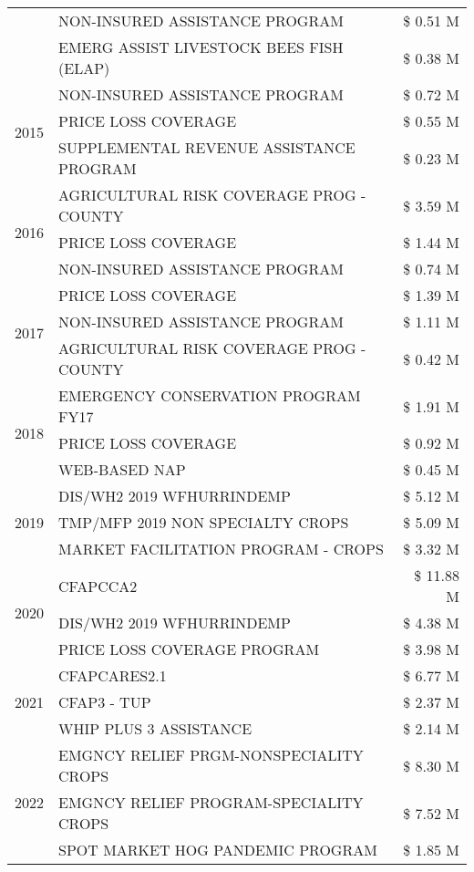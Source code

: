 \begin{tabular}{llr}
 & NON-INSURED ASSISTANCE PROGRAM & \$ 0.51 M \\
 & EMERG ASSIST LIVESTOCK BEES FISH (ELAP) & \$ 0.38 M \\
\cline{1-3}
\multirow[t]{3}{*}{2015} & NON-INSURED ASSISTANCE PROGRAM & \$ 0.72 M \\
 & PRICE LOSS COVERAGE & \$ 0.55 M \\
 & SUPPLEMENTAL REVENUE ASSISTANCE PROGRAM & \$ 0.23 M \\
\cline{1-3}
\multirow[t]{3}{*}{2016} & AGRICULTURAL RISK COVERAGE PROG - COUNTY & \$ 3.59 M \\
 & PRICE LOSS COVERAGE & \$ 1.44 M \\
 & NON-INSURED ASSISTANCE PROGRAM & \$ 0.74 M \\
\cline{1-3}
\multirow[t]{3}{*}{2017} & PRICE LOSS COVERAGE & \$ 1.39 M \\
 & NON-INSURED ASSISTANCE PROGRAM & \$ 1.11 M \\
 & AGRICULTURAL RISK COVERAGE PROG - COUNTY & \$ 0.42 M \\
\cline{1-3}
\multirow[t]{3}{*}{2018} & EMERGENCY CONSERVATION PROGRAM FY17 & \$ 1.91 M \\
 & PRICE LOSS COVERAGE & \$ 0.92 M \\
 & WEB-BASED NAP & \$ 0.45 M \\
\cline{1-3}
\multirow[t]{3}{*}{2019} & DIS/WH2 2019 WFHURRINDEMP & \$ 5.12 M \\
 & TMP/MFP 2019 NON SPECIALTY CROPS & \$ 5.09 M \\
 & MARKET FACILITATION PROGRAM - CROPS & \$ 3.32 M \\
\cline{1-3}
\multirow[t]{3}{*}{2020} & CFAPCCA2 & \$ 11.88 M \\
 & DIS/WH2 2019 WFHURRINDEMP & \$ 4.38 M \\
 & PRICE LOSS COVERAGE PROGRAM & \$ 3.98 M \\
\cline{1-3}
\multirow[t]{3}{*}{2021} & CFAPCARES2.1 & \$ 6.77 M \\
 & CFAP3 - TUP & \$ 2.37 M \\
 & WHIP PLUS 3 ASSISTANCE & \$ 2.14 M \\
\cline{1-3}
\multirow[t]{3}{*}{2022} & EMGNCY RELIEF PRGM-NONSPECIALITY CROPS & \$ 8.30 M \\
 & EMGNCY RELIEF PROGRAM-SPECIALITY CROPS & \$ 7.52 M \\
 & SPOT MARKET HOG PANDEMIC PROGRAM & \$ 1.85 M \\
\cline{1-3}
\bottomrule
\end{tabular}
